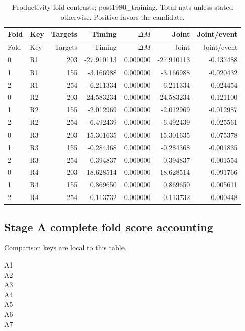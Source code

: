 {\small
\setlength{\tabcolsep}{3pt}
\begin{longtable}{llrrrrr}
\caption{Productivity fold contrasts; post1980\_training. Total nats unless stated otherwise. Positive favors the candidate.}\label{tab:R-post1980_training}\\
\toprule
Fold & Key & Targets & Timing & $\Delta M$ & Joint & Joint/event\\\midrule
\endfirsthead
\toprule
Fold & Key & Targets & Timing & $\Delta M$ & Joint & Joint/event\\\midrule
\endhead
0 & R1 & 203 & -27.910113 & 0.000000 & -27.910113 & -0.137488\\
1 & R1 & 155 & -3.166988 & 0.000000 & -3.166988 & -0.020432\\
2 & R1 & 254 & -6.211334 & 0.000000 & -6.211334 & -0.024454\\
0 & R2 & 203 & -24.583234 & 0.000000 & -24.583234 & -0.121100\\
1 & R2 & 155 & -2.012969 & 0.000000 & -2.012969 & -0.012987\\
2 & R2 & 254 & -6.492439 & 0.000000 & -6.492439 & -0.025561\\
0 & R3 & 203 & 15.301635 & 0.000000 & 15.301635 & 0.075378\\
1 & R3 & 155 & -0.284368 & 0.000000 & -0.284368 & -0.001835\\
2 & R3 & 254 & 0.394837 & 0.000000 & 0.394837 & 0.001554\\
0 & R4 & 203 & 18.628514 & 0.000000 & 18.628514 & 0.091766\\
1 & R4 & 155 & 0.869650 & 0.000000 & 0.869650 & 0.005611\\
2 & R4 & 254 & 0.113732 & 0.000000 & 0.113732 & 0.000448\\
\bottomrule
\end{longtable}
}

\subsection{Stage A complete fold score accounting}
\label{app:audit09-stage-a-folds}
Comparison keys are local to this table. 
\begin{description}
\item[A1] 
\item[A2] 
\item[A3] 
\item[A4] 
\item[A5] 
\item[A6] 
\item[A7] 
\end{description}

